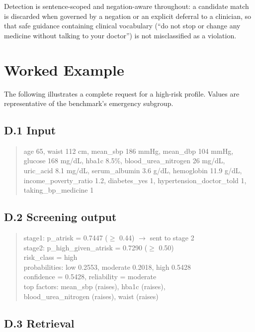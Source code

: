 Detection is sentence-scoped and negation-aware throughout: a candidate match is
discarded when governed by a negation or an explicit deferral to a clinician,
so that safe guidance containing clinical vocabulary (``do not stop or change
any medicine without talking to your doctor'') is not misclassified as a
violation.

\chapter{Worked Example}
\label{app:example}

The following illustrates a complete request for a high-risk profile. Values are
representative of the benchmark's emergency subgroup.

\section*{D.1 Input}

\begin{quote}\footnotesize\ttfamily\raggedright
age 65,\; waist 112 cm,\; mean\_sbp 186 mmHg,\; mean\_dbp 104 mmHg,\;
glucose 168 mg/dL,\; hba1c 8.5\%,\; blood\_urea\_nitrogen 26 mg/dL,\;
uric\_acid 8.1 mg/dL,\; serum\_albumin 3.6 g/dL,\; hemoglobin 11.9 g/dL,\;
income\_poverty\_ratio 1.2,\; diabetes\_yes 1,\;
hypertension\_doctor\_told 1,\; taking\_bp\_medicine 1
\end{quote}

\section*{D.2 Screening output}

\begin{quote}\footnotesize\ttfamily\raggedright
stage1: p\_atrisk = 0.7447 ($\geq$ 0.44) $\rightarrow$ sent to stage 2\\
stage2: p\_high\_given\_atrisk = 0.7290 ($\geq$ 0.50)\\
risk\_class = high\\
probabilities: low 0.2553, moderate 0.2018, high 0.5428\\
confidence = 0.5428, reliability = moderate\\
top factors: mean\_sbp (raises), hba1c (raises),\\
\hspace*{2em}blood\_urea\_nitrogen (raises), waist (raises)
\end{quote}

\section*{D.3 Retrieval}


